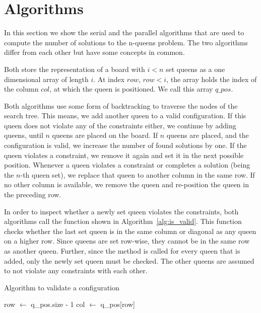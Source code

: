 \section{Algorithms}
\label{sec:algorithms}
In this section we show the serial and the parallel algorithms that are used to compute the number of solutions to the n-queens problem.
The two algorithms differ from each other but have some concepts in common.

Both store the representation of a board with $i<n$ set queens as a one dimensional array of length $i$.
At index $row$, $row<i$, the array holds the index of the column $col$, at which the queen is positioned.
We call this array $q\_pos$.

Both algorithms use some form of backtracking to traverse the nodes of the search tree.
This means, we add another queen to a valid configuration.
If this queen does not violate any of the constraints either, we continue by adding queens, until $n$ queens are placed on the board.
If $n$ queens are placed, and the configuration is valid, we increase the number of found solutions by one.
If the queen violates a constraint, we remove it again and set it in the next possible position.
Whenever a queen violates a constraint or completes a solution (being the $n$-th queen set), we replace that queen to another column in the same row.
If no other column is available, we remove the queen and re-position the queen in the preceding row.

In order to inspect whether a newly set queen violates the constraints, both algorithms call the function shown in Algorithm~\ref{alg:is_valid}.
This function checks whether the last set queen is in the same column or diagonal as any queen on a higher row.
Since queens are set row-wise, they cannot be in the same row as another queen.
Further, since the method is called for every queen that is added, only the newly set queen must be checked.
The other queens are assumed to not violate any constraints with each other.

\begin{algorithm}[H]
\caption{Algorithm to validate a configuration}
\label{alg:is_valid}
\begin{algorithmic}[1]
        \State row $\gets$ q\_pos.size - 1
        \State col $\gets$ q\_pos[row]
                \State{}
            \EndIf
        \EndFor
        \State{}
    \EndFunction
\end{algorithmic}
\end{algorithm}



